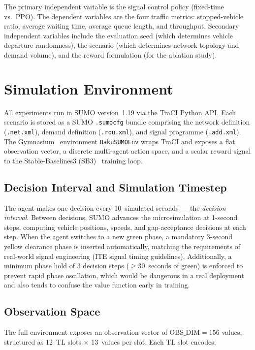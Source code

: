 \documentclass[12pt,oneside,a4paper]{report}
\newcommand{\ppo}{\textsc{PPO}}
\begin{document}
The primary independent variable is the signal control policy
(fixed-time vs.\ \ppo{}).  The dependent variables are the four
traffic metrics: stopped-vehicle ratio, average waiting time,
average queue length, and throughput.  Secondary independent
variables include the evaluation seed (which determines vehicle
departure randomness), the scenario (which determines network
topology and demand volume), and the reward formulation (for
the ablation study).

\section{Simulation Environment}
\label{sec:env}

All experiments run in SUMO version~1.19 via the TraCI Python API.
Each scenario is stored as a SUMO \texttt{.sumocfg} bundle comprising
the network definition (\texttt{.net.xml}), demand definition
(\texttt{.rou.xml}), and signal programme (\texttt{.add.xml}).
The Gymnasium~\cite{gymnasium2023, openai_gym2016} environment
\texttt{BakuSUMOEnv} wraps TraCI and exposes a flat observation
vector, a discrete multi-agent action space, and a scalar reward
signal to the Stable-Baselines3 (SB3)~\cite{sb32021} training loop.

\subsection{Decision Interval and Simulation Timestep}

The agent makes one decision every 10~simulated seconds --- the
\emph{decision interval}.  Between decisions, SUMO advances the
microsimulation at 1-second steps, computing vehicle positions,
speeds, and gap-acceptance decisions at each step.  When the agent
switches to a new green phase, a mandatory 3-second yellow clearance
phase is inserted automatically, matching the requirements of
real-world signal engineering (ITE signal timing guidelines).
Additionally, a minimum phase hold of 3 decision steps
($\geq 30$~seconds of green) is enforced to prevent rapid phase
oscillation, which would be dangerous in a real deployment and also
tends to confuse the value function early in training.

\subsection{Observation Space}

The full environment exposes an observation vector of
$\text{OBS\_DIM} = 156$ values, structured as 12~TL slots
$\times$ 13~values per slot.  Each TL slot encodes:
\end{document}
